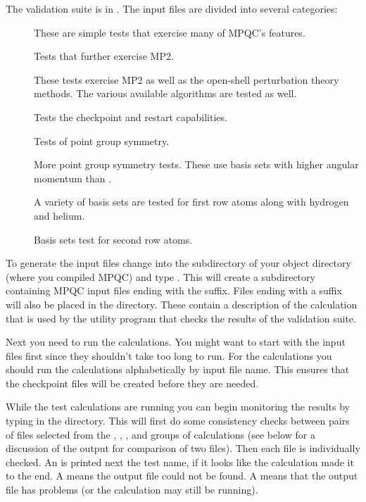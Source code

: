  The validation suite is in .  The
input files are divided into several categories:
\begin{description}
  \item[] These are simple tests that exercise many of MPQC's
        features.

  \item[] Tests that further exercise MP2.

  \item[] These tests exercise MP2 as well as the open-shell
        perturbation theory methods.  The various available
        algorithms are tested as well.

  \item[] Tests the checkpoint and restart capabilities.

  \item[] Tests of point group symmetry.

  \item[] More point group symmetry tests.  These use basis
        sets with higher angular momentum than .

  \item[] A variety of basis sets are tested for first row
        atoms along with hydrogen and helium.

  \item[] Basis sets test for second row atoms.

\end{description}

  To generate the input files change into the 
subdirectory of your object directory (where you compiled MPQC) and type
.  This will create a  subdirectory containing
MPQC input files ending with the  suffix.  Files ending with a
 suffix will also be placed in the  directory.
These contain a description of the calculation that is used by the utility
program that checks the results of the validation suite.

  Next you need to run the calculations.  You might want to start with the
 input files first since they shouldn't take too long to run.
For the  calculations you should run the calculations
alphabetically by input file name.  This ensures that the checkpoint files
will be created before they are needed.

  While the test calculations are running you can begin monitoring the
results by typing  in the 
directory.  This will first do some consistency checks between pairs of
files selected from the , , , and
 groups of calculations (see below for a discussion of the
output for comparison of two files).  Then each file is individually
checked.  An  is printed next the test name, if it looks like the
calculation made it to the end.  A  means the output file
could not be found.  A  means that the output file has
problems (or the calculation may still be running).

